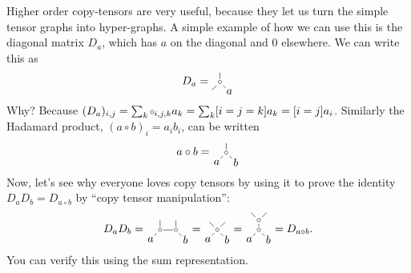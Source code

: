 Higher order copy-tensors are very useful, because they let us turn the simple tensor graphs into hyper-graphs.
A simple example of how we can use this is the diagonal matrix $D_a$, which has $a$ on the diagonal and 0 elsewhere.
We can write this as
\[
   D_a = 
   \begin{tikzpicture}[baseline=(T.base), inner sep=1pt]
      \node (T) {$\sbullet$};
      \node (x) at (.3,-.3) {$a$};
      \draw (T) -- (x);
      \draw (T) -- ++(-.25,-.25);
      \draw (T) -- ++(0,.3);
   \end{tikzpicture}
\]
Why?
Because $(D_a)_{i,j} = \sum_k \sbullet_{i,j,k} a_k = \sum_k [i=j=k] a_k = [i=j] a_i$.
Similarly the Hadamard product, $(a\circ b)_i = a_i b_i$, can be written
\[
   a \circ b =
   \begin{tikzpicture}[baseline=(T.base), inner sep=1pt]
      \node (T) {$\sbullet$};
      \node (a) at (-.3,-.3) {$a$};
      \node (b) at (.3,-.3) {$b$};
      \draw (T) -- (a);
      \draw (T) -- (b);
      \draw (T) -- ++(0,.3);
   \end{tikzpicture}
\]
Now, let's see why everyone loves copy tensors by using it to
prove the identity $D_aD_b = D_{a\circ b}$ by ``copy tensor manipulation'':
\[
   D_a D_b =
   \begin{tikzpicture}[baseline=(T.base), inner sep=1pt]
      \node (T) {$\sbullet$};
      \node (a) at (-.3,-.3) {$a$};
      \draw (T) -- (a);
      \node (T2) at (.5,0) {$\sbullet$};
      \node (b) at (.8,-.3) {$b$};
      \draw (T) -- ++(0,.3);
      \draw (T) -- (T2);
      \draw (T2) -- (b);
      \draw (T2) -- ++(0,.3);
   \end{tikzpicture}
   =
   \begin{tikzpicture}[baseline=(T.base), inner sep=1pt]
      \node (T) {$\sbullet$};
      \node (a) at (-.3,-.3) {$a$};
      \node (b) at (.3,-.3) {$b$};
      \draw (T) -- (a);
      \draw (T) -- (b);
      \draw (T) -- ++(.25,.25);
      \draw (T) -- ++(-.25,.25);
   \end{tikzpicture}
   =
   \begin{tikzpicture}[baseline=(T.base), inner sep=1pt]
      \node (T) {$\sbullet$};
      \node (a) at (-.3,-.3) {$a$};
      \node (b) at (.3,-.3) {$b$};
      \draw (T) -- (a);
      \draw (T) -- (b);
      \node (T2) at (0,.3) {$\sbullet$};
      \draw (T) -- (T2);
      \draw (T2) -- ++(.25,.25);
      \draw (T2) -- ++(-.25,.25);
   \end{tikzpicture}
   =
   D_{a\circ b}.
\]
You can verify this using the sum representation.

